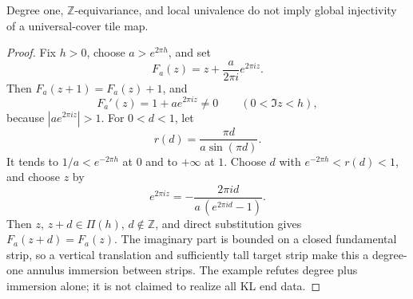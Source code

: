 \begin{theorem}\label{thm:degree-one-counterexample}
Degree one, \(\mathbb Z\)-equivariance, and local univalence do not imply global injectivity of a universal-cover tile map.
\end{theorem}

\begin{proof}
Fix \(h>0\), choose \(a>e^{2\pi h}\), and set
\[
F_a(z)=z+\frac{a}{2\pi i}e^{2\pi i z}.
\]
Then \(F_a(z+1)=F_a(z)+1\), and
\[
F_a'(z)=1+a e^{2\pi i z}\neq 0\qquad(0<\Im z<h),
\]
because \(|a e^{2\pi i z}|>1\). For \(0<d<1\), let
\[
r(d)=\frac{\pi d}{a\sin(\pi d)} .
\]
It tends to \(1/a<e^{-2\pi h}\) at \(0\) and to \(+\infty\) at \(1\). Choose \(d\) with \(e^{-2\pi h}<r(d)<1\), and choose \(z\) by
\[
e^{2\pi i z}=-\frac{2\pi i d}{a\,(e^{2\pi i d}-1)} .
\]
Then \(z,\,z+d\in\Pi(h)\), \(d\notin\mathbb Z\), and direct substitution gives \(F_a(z+d)=F_a(z)\). The imaginary part is bounded on a closed fundamental strip, so a vertical translation and sufficiently tall target strip make this a degree-one annulus immersion between strips. The example refutes degree plus immersion alone; it is not claimed to realize all KL end data.
\end{proof}